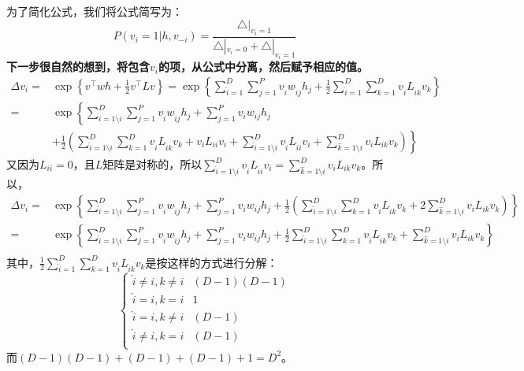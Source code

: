 \documentclass[a4paper]{article}
\begin{document}
为了简化公式，我们将公式简写为：
\begin{equation}
    P\left(v_{i}=1 | h, v_{-i}\right) = \frac{\triangle|_{v_i = 1}}{\triangle|_{v_i = 0} + \triangle|_{v_i = 1}}
\end{equation}
\textbf{下一步很自然的想到，将包含$v_i$的项，从公式中分离，然后赋予相应的值。}
\begin{equation}\begin{aligned}
\Delta v_{i}=& \exp \left\{v^{\top} w h+\frac{1}{2} v^{\top} L v\right\}=\exp \left\{\sum_{\hat{i}=1}^{D} \sum_{j=1}^{P} v_{\hat{i}} w_{\hat{i} j} h_{j}+\frac{1}{2} \sum_{\hat{i}=1}^{D} \sum_{k=1}^{D} v_{\hat{i}} L_{\hat{i} k} v_{k}\right\} \\
=& \exp \left\{\sum_{\hat{i}=1\setminus i}^{D} \sum_{j=1}^{P} v_{\hat{i}} w_{\hat{i} j} h_{j}+\sum_{j=1}^{P} v_{i} w_{i j} h_{j}\right.\\
&\left. +\frac{1}{2}\left(\sum_{\hat{i}=1\setminus i}^{D} \sum_{k=1}^{D} v_{\hat{i}} L_{\hat{i} k} v_{k}+v_{i} L_{i i} v_{i} + \sum_{\hat{i}=1\setminus i}^{D} v_{\hat{i}} L_{\hat{i} i} v_{i} + \sum_{\hat{k}=1\setminus i}^{D} v_{i} L_{i k} v_{k} \right) \right\}
\end{aligned}\end{equation}
又因为$L_{ii}=0$，且$L$矩阵是对称的，所以$\sum_{\hat{i}=1\setminus i}^{D} v_{\hat{i}} L_{\hat{i} i} v_{i} = \sum_{\hat{k}=1\setminus i}^{D} v_{i} L_{i k} v_{k}$。所以，
\begin{equation}
    \begin{split}
        \Delta v_{i}=& \exp \left\{\sum_{\hat{i}=1\setminus i}^{D} \sum_{j=1}^{P} v_{\hat{i}} w_{\hat{i} j} h_{j}+\sum_{j=1}^{P} v_{i} w_{i j} h_{j} +\frac{1}{2}\left(\sum_{\hat{i}=1\setminus i}^{D} \sum_{k=1}^{D} v_{\hat{i}} L_{\hat{i} k} v_{k} + 2 \sum_{\hat{k}=1\setminus i}^{D} v_{i} L_{i k} v_{k} \right) \right\} \\
        = & \exp \left\{\sum_{\hat{i}=1\setminus i}^{D} \sum_{j=1}^{P} v_{\hat{i}} w_{\hat{i} j} h_{j}+\sum_{j=1}^{P} v_{i} w_{i j} h_{j} +\frac{1}{2}\sum_{\hat{i}=1\setminus i}^{D} \sum_{k=1}^{D} v_{\hat{i}} L_{\hat{i} k} v_{k} +  \sum_{\hat{k}=1\setminus i}^{D} v_{i} L_{i k} v_{k} \right\} \\
    \end{split}
\end{equation}
其中，$\frac{1}{2} \sum_{\hat{i}=1}^{D} \sum_{k=1}^{D} v_{\hat{i}} L_{\hat{i} k} v_{k}$是按这样的方式进行分解：
\begin{equation}
    \left\{
    \begin{array}{ll}
      \hat{i} \neq i, k \neq i & (D-1)(D-1) \\
      \hat{i} = i, k = i & 1 \\
      \hat{i} = i, k \neq i & (D-1) \\
      \hat{i} \neq i, k = i & (D-1) \\
    \end{array}
    \right.
\end{equation}
而$(D-1)(D-1) + (D-1) + (D-1) + 1 = D^2$。
\end{document}
